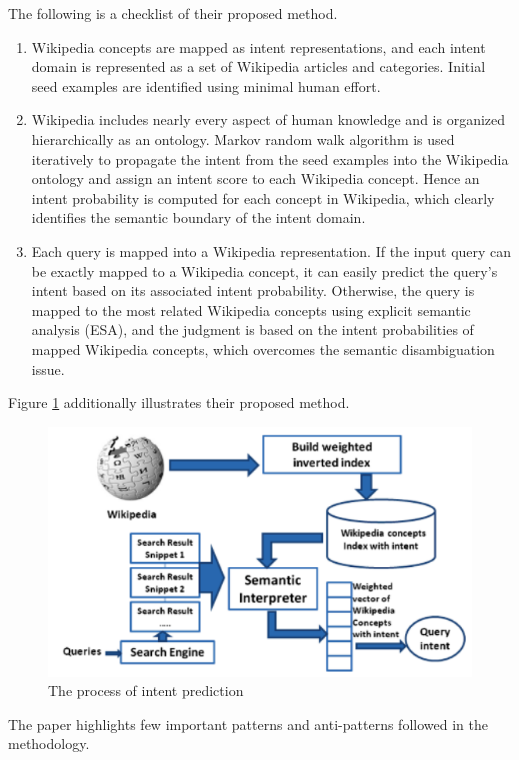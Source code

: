 \documentclass{report}
\begin{document}
The following is a checklist of their proposed method.
\begin{enumerate}
\item Wikipedia concepts are mapped as intent representations, and each intent domain is represented as a
set of Wikipedia articles and categories. Initial seed examples are identified using minimal human effort.
\item Wikipedia includes nearly every aspect of human knowledge and is organized hierarchically as an ontology.
Markov random walk algorithm is used iteratively to propagate the intent from the seed examples into the 
Wikipedia ontology and assign an intent score to each Wikipedia concept. Hence an intent probability is 
computed for each concept in Wikipedia, which clearly identifies the semantic boundary of the intent domain.
\item Each query is mapped into a Wikipedia representation. If the input query can be exactly mapped to a 
Wikipedia concept, it can easily predict the query's intent based on its associated intent probability. 
Otherwise, the query is mapped to the most related Wikipedia concepts using explicit semantic analysis (ESA),
and the judgment is based on the intent probabilities of mapped Wikipedia concepts, which overcomes the 
semantic disambiguation issue.
\end{enumerate}

Figure \ref{fig:wiki} additionally illustrates their proposed method.

\begin{figure}
\includegraphics[scale=0.45]{img/wiki-intent-prediction}
\caption{The process of intent prediction}
\label{fig:wiki}
\end{figure}

The paper highlights few important patterns and anti-patterns followed in the methodology.\\
\end{document}
